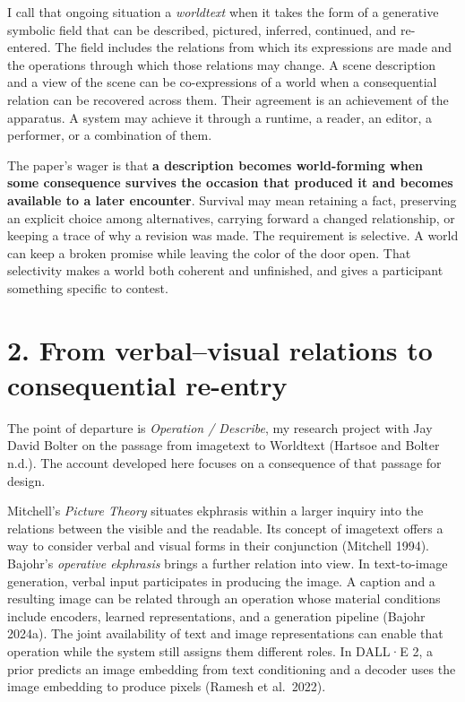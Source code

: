 \documentclass[
  11pt,
  letterpaper,
]{article}
\begin{document}
I call that ongoing situation a \emph{worldtext} when it takes the form
of a generative symbolic field that can be described, pictured,
inferred, continued, and re-entered. The field includes the relations
from which its expressions are made and the operations through which
those relations may change. A scene description and a view of the scene
can be co-expressions of a world when a consequential relation can be
recovered across them. Their agreement is an achievement of the
apparatus. A system may achieve it through a runtime, a reader, an
editor, a performer, or a combination of them.

The paper's wager is that \textbf{a description becomes world-forming
when some consequence survives the occasion that produced it and becomes
available to a later encounter}. Survival may mean retaining a fact,
preserving an explicit choice among alternatives, carrying forward a
changed relationship, or keeping a trace of why a revision was made. The
requirement is selective. A world can keep a broken promise while
leaving the color of the door open. That selectivity makes a world both
coherent and unfinished, and gives a participant something specific to
contest.

\hypertarget{from-verbalvisual-relations-to-consequential-re-entry}{%
\section{2. From verbal--visual relations to consequential
re-entry}\label{from-verbalvisual-relations-to-consequential-re-entry}}

The point of departure is \emph{Operation / Describe}, my research
project with Jay David Bolter on the passage from imagetext to Worldtext
(Hartsoe and Bolter n.d.). The account developed here focuses on a
consequence of that passage for design.

Mitchell's \emph{Picture Theory} situates ekphrasis within a larger
inquiry into the relations between the visible and the readable. Its
concept of imagetext offers a way to consider verbal and visual forms in
their conjunction (Mitchell 1994). Bajohr's \emph{operative ekphrasis}
brings a further relation into view. In text-to-image generation, verbal
input participates in producing the image. A caption and a resulting
image can be related through an operation whose material conditions
include encoders, learned representations, and a generation pipeline
(Bajohr 2024a). The joint availability of text and image representations
can enable that operation while the system still assigns them different
roles. In DALL·E 2, a prior predicts an image embedding from text
conditioning and a decoder uses the image embedding to produce pixels
(Ramesh et al.~2022).
\end{document}

